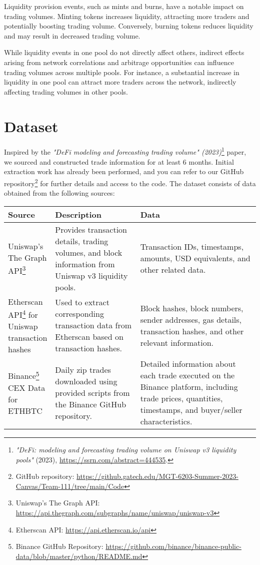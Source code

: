 \documentclass{article}
\begin{document}
{Liquidity provision events, such as mints and burns, have a notable impact on trading volumes. Minting tokens increases liquidity, attracting more traders and potentially boosting trading volume. Conversely, burning tokens reduces liquidity and may result in decreased trading volume.

While liquidity events in one pool do not directly affect others, indirect effects arising from network correlations and arbitrage opportunities can influence trading volumes across multiple pools. For instance, a substantial increase in liquidity in one pool can attract more traders across the network, indirectly affecting trading volumes in other pools.

\section*{Dataset}

Inspired by the \textit{"DeFi modeling and forecasting trading volume" (2023)}\footnote{\textit{"DeFi: modeling and forecasting trading volume on Uniswap v3 liquidity pools"} (2023), \url{https://ssrn.com/abstract=444535}.} paper, we sourced and constructed trade information for at least 6 months. Initial extraction work has already been performed, and you can refer to our GitHub repository\footnote{GitHub repository: \url{https://github.gatech.edu/MGT-6203-Summer-2023-Canvas/Team-111/tree/main/Code}} for further details and access to the code. The dataset consists of data obtained from the following sources:


\begin{center}
\begin{tabular}{|p{0.15\linewidth}|p{0.35\linewidth}|p{0.5\linewidth}|}
\hline
\textbf{Source} & \textbf{Description} & \textbf{Data} \\
\hline
Uniswap's The Graph API\footnote{Uniswap's The Graph API: \url{https://api.thegraph.com/subgraphs/name/uniswap/uniswap-v3}} & Provides transaction details, trading volumes, and block information from Uniswap v3 liquidity pools. & Transaction IDs, timestamps, amounts, USD equivalents, and other related data. \\
\hline
Etherscan API\footnote{Etherscan API: \url{https://api.etherscan.io/api}} for Uniswap transaction hashes & Used to extract corresponding transaction data from Etherscan based on transaction hashes. & Block hashes, block numbers, sender addresses, gas details, transaction hashes, and other relevant information. \\
\hline
Binance\footnote{Binance GitHub Repository: \url{https://github.com/binance/binance-public-data/blob/master/python/README.md}} CEX Data for ETHBTC & Daily zip trades downloaded using provided scripts from the Binance GitHub repository. & Detailed information about each trade executed on the Binance platform, including trade prices, quantities, timestamps, and buyer/seller characteristics. \\
\hline
\end{tabular}
\end{center}


}
\end{document}
